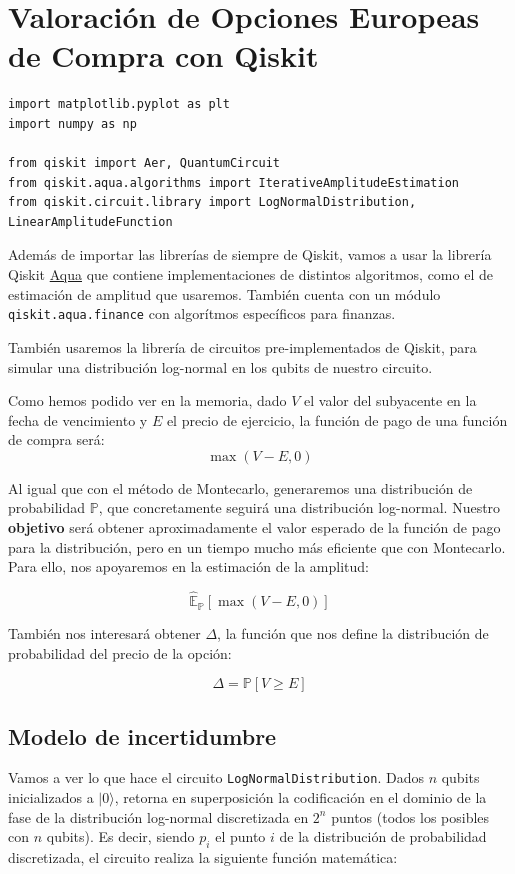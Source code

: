 \section{Valoración de Opciones Europeas de Compra con Qiskit}
\label{sec:qiskit}
\begin{verbatim}
import matplotlib.pyplot as plt
import numpy as np

from qiskit import Aer, QuantumCircuit
from qiskit.aqua.algorithms import IterativeAmplitudeEstimation
from qiskit.circuit.library import LogNormalDistribution, LinearAmplitudeFunction
\end{verbatim}

Además de importar las librerías de siempre de Qiskit, vamos a usar la librería Qiskit \href{https://qiskit.org/documentation/apidoc/qiskit_aqua.html}{Aqua} que contiene implementaciones de distintos algoritmos, como el de estimación de amplitud que usaremos. También cuenta con un módulo \texttt{qiskit.aqua.finance} con algorítmos específicos para finanzas.

También usaremos la librería de circuitos pre-implementados de Qiskit, para simular una distribución log-normal en los qubits de nuestro circuito.

Como hemos podido ver en la memoria, dado $V$ el valor del subyacente en la fecha de vencimiento y $E$ el precio de ejercicio, la función de pago de una función de compra será:
$$ \max\left(V-E,0\right) $$

Al igual que con el método de Montecarlo, generaremos una distribución de probabilidad $\mathbb{P}$, que concretamente seguirá una distribución log-normal. Nuestro \textbf{objetivo} será obtener aproximadamente el valor esperado de la función de pago para la distribución, pero en un tiempo mucho más eficiente que con Montecarlo. Para ello, nos apoyaremos en la estimación de la amplitud:

$$ \hat{\mathbb{E}}_{\mathbb{P}}\left[\max\left(V-E,0\right)\right] $$

También nos interesará obtener $\Delta$, la función que nos define la distribución de probabilidad del precio de la opción:

$$ \Delta = \mathbb{P}\left[V\geq E\right] $$

\subsection{Modelo de incertidumbre}
Vamos a ver lo que hace el circuito \texttt{LogNormalDistribution}. Dados $n$ qubits inicializados a $|0\rangle$, retorna en superposición la codificación en el dominio de la fase de la distribución log-normal discretizada en $2^n$ puntos (todos los posibles con $n$ qubits). Es decir, siendo $p_i$ el punto $i$ de la distribución de probabilidad discretizada, el circuito realiza la siguiente función matemática:

